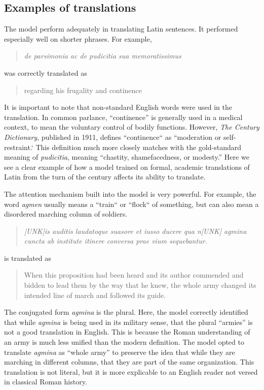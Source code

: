 \documentclass[11pt,a4paper]{article}
\begin{document}
\subsection{Examples of translations}

The model perform adequately in translating Latin sentences.
It performed especially well on shorter phrases.
For example,

\begin{quote}
    \textit{de parsimonia ac de pudicitia sua memoratissimus}
\end{quote}

was correctly translated as

\begin{quote}
    regarding his frugality and continence
\end{quote}

It is important to note that non-standard English words were used in the translation.
In common parlance, ``continence'' is generally used in a medical context, to mean the voluntary control of bodily functions.
However, \textit{The Century Dictionary}, published in 1911,
defines ``continence`` as ``moderation or self-restraint.`
This definition much more closely matches with the gold-standard meaning of \textit{pudicitia}, meaning ``chastity, shamefacedness, or modesty.''
Here we see a clear example of how a model trained on formal, academic translations of Latin from the turn of the century affects its ability to translate.

The attention mechanism built into the model is very powerful.
For example, the word \textit{agmen} usually means
a ``train`` or ``flock`` of something,
but can also mean a disordered marching column of soldiers.

\begin{quote}
    \textit{[UNK]is auditis laudatoque suasore et iusso ducere qua n[UNK] agmina cuncta ab institute itinere conversa prae vium sequebantur.}
\end{quote}

is translated as

\begin{quote}
    When this proposition had been heard and its author commended and bidden to lead them by the way that he knew, the whole army changed its intended line of march and followed its guide.
\end{quote}

The conjugated form \textit{agmina} is the plural.
Here, the model correctly identified that
while \textit{agmina} is being used in its military sense,
that the plural ``armies'' is not a good translation in English.
This is because the Roman understanding of an army
is much less unified than the modern definition.
The model opted to translate \textit{agmina} as ``whole army''
to preserve the idea that while they are marching in different columns,
that they are part of the same organization.
This translation is not literal,
but it is more explicable to an English reader
not versed in classical Roman history.
\end{document}
